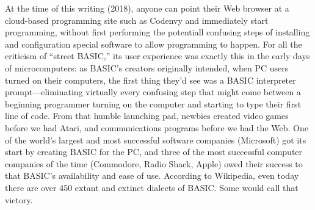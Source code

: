 At the time of this writing (2018), anyone can point their Web browser
at a cloud-based programming site such
as Codenvy and immediately start programming, without first performing
the potentiall confusing steps of installing and configuration special
software to allow programming to happen.
For all the criticism of ``street BASIC,'' its user experience was
exactly this in the early days of microcomputers: as BASIC's creators
originally intended, when PC users turned on their computers, the
first thing they'd see was a BASIC interpreter prompt---eliminating
virtually every confusing step that might come between a beginning programmer
turning on the computer and starting to type their first line
of code.
From that humble launching pad, newbies
created video games before we had Atari,
and communications programs before we had the Web.
One of the world's largest and most
successful software companies (Microsoft) got its start by creating
BASIC for the PC, and three of the most successful computer companies
of the time (Commodore, Radio Shack, Apple) owed their success to
that BASIC's availability and ease of use.
According to Wikipedia, even today there are over 450 extant and extinct
dialects of BASIC.
Some would call that victory.

